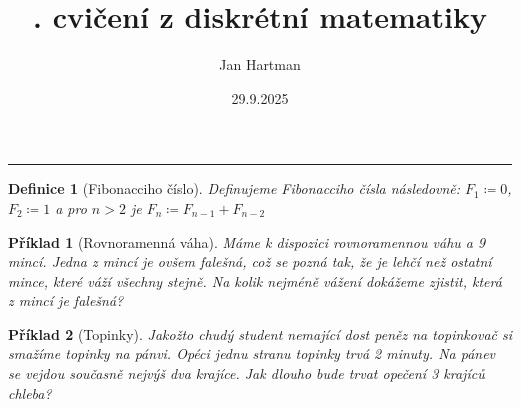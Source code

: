 \documentclass[10pt]{article}
\title{\tutnum. cvičení z diskrétní matematiky}
\author{Jan Hartman}
\date{29.9.2025}
\newcommand{\titlerule}{%
    \noindent %
    \makebox[\textwidth]{\large \thetitle \hfill \thedate}
    \rule{\textwidth}{0.4pt}%
}
\theoremstyle{definitionstyle}
\newtheorem{defn}{Definice}
\theoremstyle{problemstyle}
\newtheorem{problem}{Příklad}
\begin{document}
\titlerule

\begin{defn}[Fibonacciho číslo]
Definujeme Fibonacciho čísla následovně: $F_1 \coloneq 0$, $F_2 \coloneq 1$ a pro $n > 2$ je $F_n \coloneq F_{n-1}+F_{n-2}$
\end{defn}

\begin{problem}[Rovnoramenná váha]
Máme k dispozici rovnoramennou váhu a 9 mincí. Jedna z mincí je ovšem falešná, což se pozná tak, že je lehčí než ostatní mince, které váží všechny stejně. Na kolik nejméně vážení dokážeme zjistit, která z mincí je falešná?
\end{problem}

\begin{problem}[Topinky]
Jakožto chudý student nemající dost peněz na topinkovač si smažíme topinky na pánvi. Opéci jednu stranu topinky trvá 2 minuty. Na pánev se vejdou současně nejvýš dva krajíce. Jak dlouho bude trvat opečení 3 krajíců chleba?
\end{problem}
\end{document}

